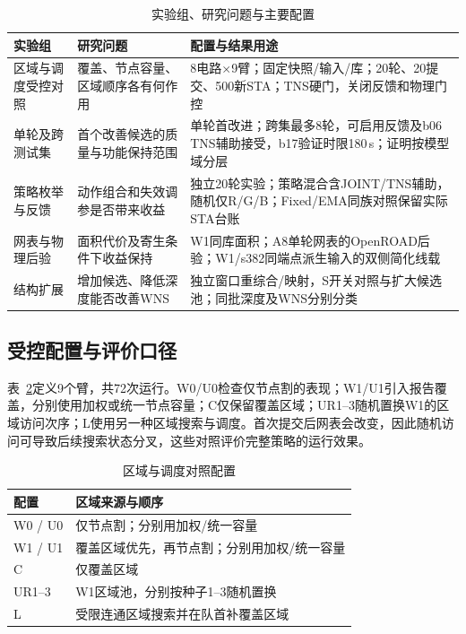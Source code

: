 \documentclass[twocolumn,10pt,fontset=windows]{ctexart}
\begin{document}
\begin{table}[!t]
\centering\caption{实验组、研究问题与主要配置}\label{tab:families}
\footnotesize\setlength{\tabcolsep}{4pt}
\begin{tabular}{p{2.1cm}p{4.2cm}p{9.1cm}}
\toprule
实验组 & 研究问题 & 配置与结果用途\\
\midrule
区域与调度受控对照 & 覆盖、节点容量、区域顺序各有何作用 & 8电路$\times$9臂；固定快照/输入/库；20轮、20提交、500新STA；TNS硬门，关闭反馈和物理门控\\
单轮及跨测试集 & 首个改善候选的质量与功能保持范围 & 单轮首改进；跨集最多8轮，可启用反馈及b06 TNS辅助接受，b17验证时限180\,s；证明按模型域分层\\
策略枚举与反馈 & 动作组合和失效调参是否带来收益 & 独立20轮实验；策略混合含JOINT/TNS辅助，随机仅R/G/B；Fixed/EMA同族对照保留实际STA台账\\
网表与物理后验 & 面积代价及寄生条件下收益保持 & W1同库面积；A8单轮网表的OpenROAD后验；W1/s382同端点派生输入的双侧简化线载\\
结构扩展 & 增加候选、降低深度能否改善WNS & 独立窗口重综合/映射，S开关对照与扩大候选池；同批深度及WNS分别分类\\
\bottomrule
\end{tabular}
\end{table}

\subsection{受控配置与评价口径}\label{sec:controlled}

表~\ref{tab:arms}定义9个臂，共72次运行。W0/U0检查仅节点割的表现；W1/U1引入报告覆盖，分别使用加权或统一节点容量；C仅保留覆盖区域；UR1--3随机置换W1的区域访问次序；L使用另一种区域搜索与调度。首次提交后网表会改变，因此随机访问可导致后续搜索状态分叉，这些对照评价完整策略的运行效果。

\begin{table}[htbp]
\centering\caption{区域与调度对照配置}\label{tab:arms}
\footnotesize\setlength{\tabcolsep}{3pt}
\begin{tabular}{p{1.6cm}p{5.9cm}}
\toprule 配置 & 区域来源与顺序\\\midrule
W0 / U0 & 仅节点割；分别用加权/统一容量\\
W1 / U1 & 覆盖区域优先，再节点割；分别用加权/统一容量\\
C & 仅覆盖区域\\
UR1--3 & W1区域池，分别按种子1--3随机置换\\
L & 受限连通区域搜索并在队首补覆盖区域\\
\bottomrule\end{tabular}
\end{table}
\end{document}
